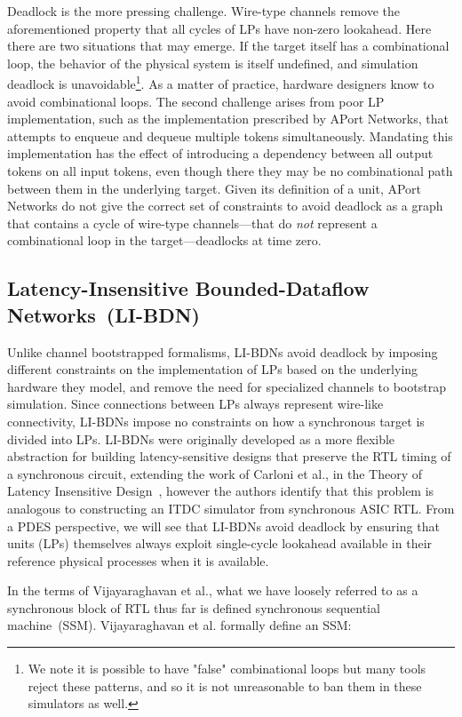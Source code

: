Deadlock is the more pressing challenge. Wire-type channels remove the
aforementioned property that all cycles of LPs have non-zero lookahead.  Here there are
two situations that may emerge. If the target itself has a combinational loop,
the behavior of the physical system is itself undefined, and simulation
deadlock is unavoidable\footnote{We note it is possible to have "false"
combinational loops but many tools reject these patterns, and so it is not
unreasonable to ban them in these simulators as well.}. As a matter of
practice, hardware designers know to avoid combinational loops. The second
challenge arises from poor LP implementation, such as the implementation prescribed by
APort Networks, that attempts to enqueue and dequeue multiple tokens
simultaneously. Mandating this implementation has the effect of introducing a
dependency between all output tokens on all input tokens, even though there
they may be no combinational path between them in
the underlying target. Given its definition of a unit, APort Networks do not
give the correct set of constraints to avoid deadlock as a graph that contains
a cycle of wire-type channels---that do \emph{not} represent a combinational loop in
the target---deadlocks at time zero.


\subsection{Latency-Insensitive Bounded-Dataflow Networks~(LI-BDN)}

Unlike channel bootstrapped formalisms, LI-BDNs avoid deadlock by imposing
different constraints on the implementation of LPs based on the underlying
hardware they model, and remove the need for specialized channels to bootstrap
simulation. Since connections between LPs always represent wire-like
connectivity, LI-BDNs impose no constraints on how a synchronous target is
divided into LPs. LI-BDNs were originally developed as a more flexible
abstraction for building latency-sensitive designs that preserve the RTL timing
of a synchronous circuit, extending the work of Carloni et al., in the Theory
of Latency Insensitive Design~\cite{TheoryOfLIDesign}, however the authors
identify that this problem is analogous to constructing an ITDC simulator from
synchronous ASIC RTL. From a PDES perspective, we will see that LI-BDNs avoid
deadlock by ensuring that units (LPs) themselves always exploit single-cycle
lookahead available in their reference physical processes when it is available.

In the terms of Vijayaraghavan et al.\cite{LIBDN}, what we have loosely referred to as a synchronous
block of RTL thus far is defined synchronous sequential machine~(SSM). Vijayaraghavan et
al.\cite{LIBDN} formally define an SSM:

